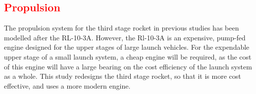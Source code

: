 		\textcolor{red}{
		\subsection{Propulsion}\label{sec:thirdstageprop}
	}
	
	The propulsion system for the third stage rocket in previous studies has been modelled after the RL-10-3A\cite{Preller2018a}. However, the Rl-10-3A is an expensive, pump-fed engine designed for the upper stages of large launch vehicles. For the expendable upper stage of a small launch system, a cheap engine will be required, as the cost of this engine will have a large bearing on the cost efficiency of the launch system as a whole. This study redesigns the third stage rocket, so that it is more cost effective, and uses a more modern engine.  
	
	
